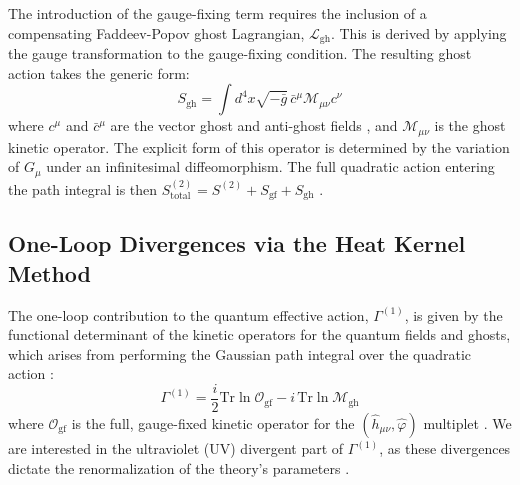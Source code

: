 \documentclass[twocolumn]{aastex631}
\begin{document}
The introduction of the gauge-fixing term requires the inclusion of a compensating Faddeev-Popov ghost Lagrangian, $\mathcal{L}_{\text{gh}}$. This is derived by applying the gauge transformation to the gauge-fixing condition. The resulting ghost action takes the generic form: \citep{altschul2005lorentzviolationfaddeevpopovghosts,faizal2008fpghostpropagatorsyangmillstheories,mckeon2024fieldredefinitioninvariantlagrange,brandt2024generalcovariantgaugefixing}
\begin{equation}S_{\text{gh}} = \int d^4x \sqrt{-\bar{g}} \, \bar{c}^\mu \mathcal{M}_{\mu\nu} c^\nu\end{equation}
where $c^\mu$ and $\bar{c}^\mu$ are the vector ghost and anti-ghost fields \citep{kugo2022covariantbrstquantizationunimodular}, and $\mathcal{M}_{\mu\nu}$ is the ghost kinetic operator. The explicit form of this operator is determined by the variation of $G_\mu$ under an infinitesimal diffeomorphism. The full quadratic action entering the path integral is then $S^{(2)}_{\text{total}} = S^{(2)} + S_{\text{gf}} + S_{\text{gh}}$ \citep{kugo2022covariantbrstquantizationunimodular}.

\subsection{One-Loop Divergences via the Heat Kernel Method}
The one-loop contribution to the quantum effective action, $\Gamma^{(1)}$, is given by the functional determinant of the kinetic operators for the quantum fields and ghosts, which arises from performing the Gaussian path integral over the quadratic action \citep{kakkad2022oneloopeffectiveactionapproach,ferrero2025oneloopeffectiveactioncoherent,liu2025scatteringapproachcalculatingoneloop}:
\begin{equation}\Gamma^{(1)} = \frac{i}{2} \text{Tr} \ln \mathbf{\mathcal{O}}_{\text{gf}} - i \, \text{Tr} \ln \mathcal{M}_{\text{gh}}\end{equation}
where $\mathbf{\mathcal{O}}_{\text{gf}}$ is the full, gauge-fixed kinetic operator for the $(\hat{h}_{\mu\nu}, \hat{\varphi})$ multiplet \citep{guendelman1993heatkernelcovariantbackground,moffat2026gaugeinvariantentirefunctionregulatorsuv}. We are interested in the ultraviolet (UV) divergent part of $\Gamma^{(1)}$, as these divergences dictate the renormalization of the theory's parameters \citep{xue2014ultravioletfixedpointmassive,moffat2026gaugeinvariantentirefunctionregulatorsuv}.
\end{document}
